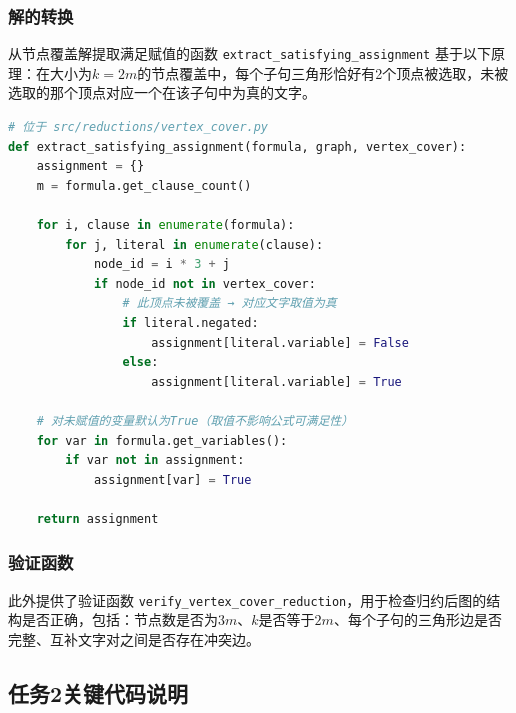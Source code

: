 \documentclass{sysucseexp}
\begin{document}
\subsubsection{解的转换}

从节点覆盖解提取满足赋值的函数 \texttt{extract\_satisfying\_assignment} 基于以下原理：在大小为$k = 2m$的节点覆盖中，每个子句三角形恰好有2个顶点被选取，未被选取的那个顶点对应一个在该子句中为真的文字。

\begin{lstlisting}[language=Python]
# 位于 src/reductions/vertex_cover.py
def extract_satisfying_assignment(formula, graph, vertex_cover):
    assignment = {}
    m = formula.get_clause_count()

    for i, clause in enumerate(formula):
        for j, literal in enumerate(clause):
            node_id = i * 3 + j
            if node_id not in vertex_cover:
                # 此顶点未被覆盖 → 对应文字取值为真
                if literal.negated:
                    assignment[literal.variable] = False
                else:
                    assignment[literal.variable] = True

    # 对未赋值的变量默认为True（取值不影响公式可满足性）
    for var in formula.get_variables():
        if var not in assignment:
            assignment[var] = True

    return assignment
\end{lstlisting}

\subsubsection{验证函数}

此外提供了验证函数 \texttt{verify\_vertex\_cover\_reduction}，用于检查归约后图的结构是否正确，包括：节点数是否为$3m$、$k$是否等于$2m$、每个子句的三角形边是否完整、互补文字对之间是否存在冲突边。

\subsection{任务2关键代码说明}
\end{document}
